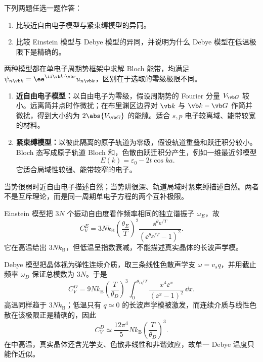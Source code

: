 \begin{question}[10 分]
下列两题任选一题作答：
\begin{enumerate}
  \item 比较近自由电子模型与紧束缚模型的异同。
  \item 比较 Einstein 模型与 Debye 模型的异同，并说明为什么 Debye 模型在低温极限下是精确的。
\end{enumerate}


\begin{solution}
两种模型都在单电子周期势框架中求解 Bloch 能带，均满足
$\psi_{n\vb k}=\ee^{\ii\vb k\cdot\vb r}u_{n\vb k}$，区别在于选取的零级极限不同。
\begin{enumerate}
  \item \textbf{近自由电子模型：}以自由电子为零级，假设周期势的 Fourier 分量 $V_{\vb G}$ 较小。远离简并点时作微扰；在布里渊区边界对 $\vb k$ 与 $\vb k-\vb G$ 作简并微扰，得到大小约为 $2\abs{V_{\vb G}}$ 的能隙。适合 $s,p$ 电子较离域、能带较宽的材料。
  \item \textbf{紧束缚模型：}以彼此隔离的原子轨道为零级，假设轨道重叠和跃迁积分较小。Bloch 态写成原子轨道 Bloch 和，色散由跃迁积分产生，例如一维最近邻模型
  \[
    E(k)=\varepsilon_0-2t\cos ka.
  \]
  它适合局域性较强、能带较窄的电子。
\end{enumerate}
当势很弱时近自由电子描述自然；当势阱很深、轨道局域时紧束缚描述自然。两者不是互斥理论，而是同一周期单电子方程的两个互补极限。



Einstein 模型把 $3N$ 个振动自由度看作频率相同的独立谐振子 $\omega_E$，故
\[
 C_V^{E}=3Nk_{\mathrm B}
 \left(\frac{\theta_E}{T}\right)^2
 \frac{\ee^{\theta_E/T}}{(\ee^{\theta_E/T}-1)^2}.
\]
它在高温给出 $3Nk_{\mathrm B}$，但低温呈指数衰减，不能描述真实晶体的长波声学模。

Debye 模型把晶体视为弹性连续介质，取三条线性色散声学支
$\omega=v_s q$，并用截止频率 $\omega_D$ 保证总模数为 $3N$。于是
\[
 C_V^{D}=9Nk_{\mathrm B}\left(\frac{T}{\theta_D}\right)^3
 \int_0^{\theta_D/T}
 \frac{x^4\ee^x}{(\ee^x-1)^2}\,\dd x.
\]
高温同样趋于 $3Nk_{\mathrm B}$；低温只有 $q\simeq0$ 的长波声学模被激发，而连续介质与线性色散在该极限正是精确的，因此
\[
 \boxed{C_V^{D}\simeq\frac{12\pi^4}{5}Nk_{\mathrm B}
 \left(\frac{T}{\theta_D}\right)^3.}
\]
在中高温，真实晶体还含光学支、色散非线性和非谐效应，故单一 Debye 温度只能作近似。
\end{solution}
\end{question}

